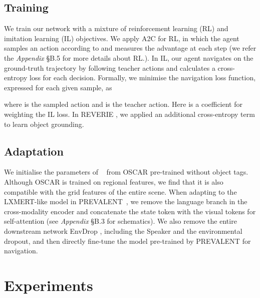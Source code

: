 \documentclass[final]{cvpr}
\begin{document}
\subsection{Training}
We train our network with a mixture of reinforcement learning (RL) and imitation learning (IL) objectives. We apply A2C \cite{mnih2016asynchronous} for RL, in which the agent samples an action according to  and measures the advantage  at each step (we refer the \textit{Appendix} \S B.5 for more details about RL.). In IL, our agent navigates on the ground-truth trajectory by following teacher actions and calculates a cross-entropy loss for each decision. Formally, we minimise the navigation loss function, expressed for each given sample, as

where  is the sampled action and  is the teacher action. Here  is a coefficient for weighting the IL loss. In REVERIE \cite{qi2020reverie}, we applied an additional cross-entropy term  to learn object grounding.


\subsection{Adaptation}
We initialise the parameters of \vlnbert~ from OSCAR \cite{li2020oscar} pre-trained without object tags. Although OSCAR is trained on regional features, we find that it is also compatible with the grid features of the entire scene. 
When adapting to the LXMERT-like \cite{tan2019lxmert} model in PREVALENT~\cite{hao2020towards}, we remove the language branch in the cross-modality encoder and concatenate the state token with the visual tokens for self-attention (see \textit{Appendix} \S B.3 for schematics). We also remove the entire downstream network EnvDrop \cite{tan2019learning}, including the Speaker and the environmental dropout, and then directly fine-tune the model pre-trained by PREVALENT for navigation. 

 \section{Experiments} 
\label{sec:experiments}
\end{document}
